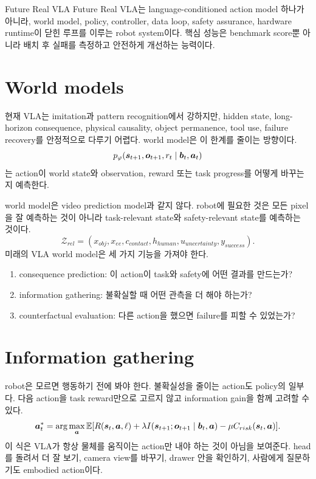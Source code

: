 \begin{definitionbox}{Future Real VLA}
Future Real VLA는 language-conditioned action model 하나가 아니라, world model, policy, controller, data loop, safety assurance, hardware runtime이 닫힌 루프를 이루는 robot system이다. 핵심 성능은 benchmark score뿐 아니라 배치 후 실패를 측정하고 안전하게 개선하는 능력이다.
\end{definitionbox}

\section{World models}

현재 VLA는 imitation과 pattern recognition에서 강하지만, hidden state, long-horizon consequence, physical causality, object permanence, tool use, failure recovery를 안정적으로 다루기 어렵다. world model은 이 한계를 줄이는 방향이다.
\begin{equation}
  p_{\varphi}
  (
  \bm{s}_{t+1},
  \bm{o}_{t+1},
  r_t
  \mid
  \bm{b}_t,
  \bm{a}_t
  )
  \label{eq:ch22-world-model}
\end{equation}
는 action이 world state와 observation, reward 또는 task progress를 어떻게 바꾸는지 예측한다.

world model은 video prediction model과 같지 않다. robot에 필요한 것은 모든 pixel을 잘 예측하는 것이 아니라 task-relevant state와 safety-relevant state를 예측하는 것이다.
\begin{equation}
  \mathcal{Z}_{rel}
  =
  (
  x_{obj},
  x_{ee},
  c_{contact},
  h_{human},
  u_{uncertainty},
  y_{success}
  ).
  \label{eq:ch22-relevant-state}
\end{equation}
미래의 VLA world model은 세 가지 기능을 가져야 한다.
\begin{enumerate}
  \item consequence prediction: 이 action이 task와 safety에 어떤 결과를 만드는가?
  \item information gathering: 불확실할 때 어떤 관측을 더 해야 하는가?
  \item counterfactual evaluation: 다른 action을 했으면 failure를 피할 수 있었는가?
\end{enumerate}

\section{Information gathering}

robot은 모르면 행동하기 전에 봐야 한다. 불확실성을 줄이는 action도 policy의 일부다. 다음 action을 task reward만으로 고르지 않고 information gain을 함께 고려할 수 있다.
\begin{equation}
  \bm{a}_t^{*}
  =
  \arg\max_{\bm{a}}
  \mathbb{E}
  [
  R(\bm{s}_t,\bm{a},\ell)
  +
  \lambda I(\bm{s}_{t+1};\bm{o}_{t+1}\mid \bm{b}_t,\bm{a})
  -
  \mu C_{risk}(\bm{s}_t,\bm{a})
  ].
  \label{eq:ch22-info-action}
\end{equation}
이 식은 VLA가 항상 물체를 움직이는 action만 내야 하는 것이 아님을 보여준다. head를 돌려서 더 잘 보기, camera view를 바꾸기, drawer 안을 확인하기, 사람에게 질문하기도 embodied action이다.

